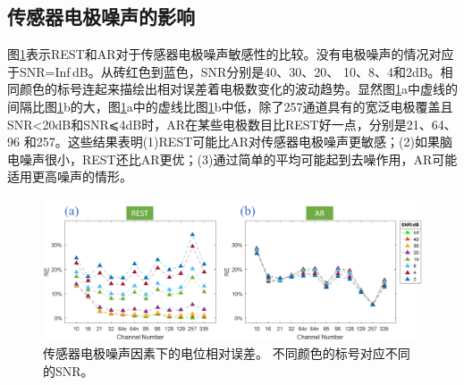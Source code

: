 \subsection{传感器电极噪声的影响}
图\ref{2:noise}表示REST和AR对于传感器电极噪声敏感性的比较。没有电极噪声的情况对应于SNR=Inf$\,$dB。从砖红色到蓝色，SNR分别是40、30、20、
10、8、4和2dB。相同颜色的标号连起来描绘出相对误差着电极数变化的波动趋势。显然图\ref{2:noise}a中虚线的间隔比图\ref{2:noise}b的大，图\ref{2:noise}a中的虚线比图\ref{2:noise}b中低，除了257通道具有的宽泛电极覆盖且SNR<20dB和SNR⩽4dB时，AR在某些电极数目比REST好一点，分别是21、64、96
和257。这些结果表明(1)REST可能比AR对传感器电极噪声更敏感；(2)如果脑电噪声很小，REST还比AR更优；(3)通过简单的平均可能起到去噪作用，AR可能适用更高噪声的情形。
\begin{figure}[h!]
	\centering
	\includegraphics[width=15cm]{pic/JNE/figure8.png}
	\caption{传感器电极噪声因素下的电位相对误差。 不同颜色的标号对应不同的SNR。}
	\label{2:noise}
\end{figure}

